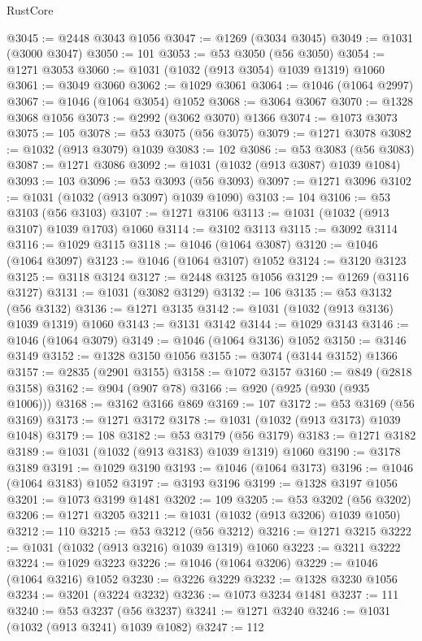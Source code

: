 \begin{lexlean}{RustCore}
\begin{coremodule}
@3045 := @2448 @3043 @1056
@3047 := @1269 (@3034 @3045)
@3049 := @1031 (@3000 @3047)
@3050 := 101
@3053 := @53 @3050 (@56 @3050)
@3054 := @1271 @3053
@3060 := @1031 (@1032 (@913 @3054) @1039 @1319) @1060
@3061 := @3049 @3060
@3062 := @1029 @3061
@3064 := @1046 (@1064 @2997)
@3067 := @1046 (@1064 @3054) @1052
@3068 := @3064 @3067
@3070 := @1328 @3068 @1056
@3073 := @2992 (@3062 @3070) @1366
@3074 := @1073 @3073
@3075 := 105
@3078 := @53 @3075 (@56 @3075)
@3079 := @1271 @3078
@3082 := @1032 (@913 @3079) @1039
@3083 := 102
@3086 := @53 @3083 (@56 @3083)
@3087 := @1271 @3086
@3092 := @1031 (@1032 (@913 @3087) @1039 @1084)
@3093 := 103
@3096 := @53 @3093 (@56 @3093)
@3097 := @1271 @3096
@3102 := @1031 (@1032 (@913 @3097) @1039 @1090)
@3103 := 104
@3106 := @53 @3103 (@56 @3103)
@3107 := @1271 @3106
@3113 := @1031 (@1032 (@913 @3107) @1039 @1703) @1060
@3114 := @3102 @3113
@3115 := @3092 @3114
@3116 := @1029 @3115
@3118 := @1046 (@1064 @3087)
@3120 := @1046 (@1064 @3097)
@3123 := @1046 (@1064 @3107) @1052
@3124 := @3120 @3123
@3125 := @3118 @3124
@3127 := @2448 @3125 @1056
@3129 := @1269 (@3116 @3127)
@3131 := @1031 (@3082 @3129)
@3132 := 106
@3135 := @53 @3132 (@56 @3132)
@3136 := @1271 @3135
@3142 := @1031 (@1032 (@913 @3136) @1039 @1319) @1060
@3143 := @3131 @3142
@3144 := @1029 @3143
@3146 := @1046 (@1064 @3079)
@3149 := @1046 (@1064 @3136) @1052
@3150 := @3146 @3149
@3152 := @1328 @3150 @1056
@3155 := @3074 (@3144 @3152) @1366
@3157 := @2835 (@2901 @3155)
@3158 := @1072 @3157
@3160 := @849 (@2818 @3158)
@3162 := @904 (@907 @78)
@3166 := @920 (@925 (@930 (@935 @1006)))
@3168 := @3162 @3166 @869
@3169 := 107
@3172 := @53 @3169 (@56 @3169)
@3173 := @1271 @3172
@3178 := @1031 (@1032 (@913 @3173) @1039 @1048)
@3179 := 108
@3182 := @53 @3179 (@56 @3179)
@3183 := @1271 @3182
@3189 := @1031 (@1032 (@913 @3183) @1039 @1319) @1060
@3190 := @3178 @3189
@3191 := @1029 @3190
@3193 := @1046 (@1064 @3173)
@3196 := @1046 (@1064 @3183) @1052
@3197 := @3193 @3196
@3199 := @1328 @3197 @1056
@3201 := @1073 @3199 @1481
@3202 := 109
@3205 := @53 @3202 (@56 @3202)
@3206 := @1271 @3205
@3211 := @1031 (@1032 (@913 @3206) @1039 @1050)
@3212 := 110
@3215 := @53 @3212 (@56 @3212)
@3216 := @1271 @3215
@3222 := @1031 (@1032 (@913 @3216) @1039 @1319) @1060
@3223 := @3211 @3222
@3224 := @1029 @3223
@3226 := @1046 (@1064 @3206)
@3229 := @1046 (@1064 @3216) @1052
@3230 := @3226 @3229
@3232 := @1328 @3230 @1056
@3234 := @3201 (@3224 @3232)
@3236 := @1073 @3234 @1481
@3237 := 111
@3240 := @53 @3237 (@56 @3237)
@3241 := @1271 @3240
@3246 := @1031 (@1032 (@913 @3241) @1039 @1082)
@3247 := 112

\end{coremodule}
\end{lexlean}
